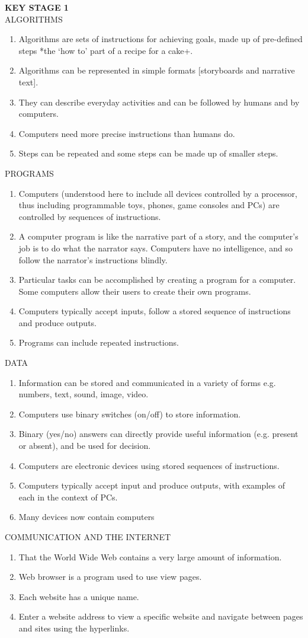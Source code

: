 \textbf{KEY STAGE 1}\\
ALGORITHMS
\begin{enumerate}
\item Algorithms are sets of instructions for achieving goals, made up of pre-defined steps
*the ‘how to’ part of a recipe for a cake+.
\item Algorithms can be represented in simple formats [storyboards and narrative text].
\item They can describe everyday activities and can be followed by humans and by
computers.
\item Computers need more precise instructions than humans do.
\item Steps can be repeated and some steps can be made up of smaller steps.
\end{enumerate}
PROGRAMS
\begin{enumerate}
\item Computers (understood here to include all devices controlled by a processor, thus
including programmable toys, phones, game consoles and PCs) are controlled by
sequences of instructions.
\item A computer program is like the narrative part of a story, and the computer’s job is to
do what the narrator says. Computers have no intelligence, and so follow the
narrator’s instructions blindly.
\item Particular tasks can be accomplished by creating a program for a computer. Some
computers allow their users to create their own programs.
\item Computers typically accept inputs, follow a stored sequence of instructions and
produce outputs.
\item Programs can include repeated instructions.
\end{enumerate}
DATA
\begin{enumerate}
\item Information can be stored and communicated in a variety of forms e.g. numbers,
text, sound, image, video.
\item Computers use binary switches (on/off) to store information.
\item Binary (yes/no) answers can directly provide useful information (e.g. present or
absent), and be used for decision.
\item Computers are electronic devices using stored sequences of instructions.
\item Computers typically accept input and produce outputs, with examples of each in the
context of PCs.
\item Many devices now contain computers
\end{enumerate}
COMMUNICATION AND THE INTERNET
\begin{enumerate}
\item That the World Wide Web contains a very large amount of information.
\item Web browser is a program used to use view pages.
\item Each website has a unique name.
\item Enter a website address to view a specific website and navigate between pages and
sites using the hyperlinks.
\end{enumerate}

